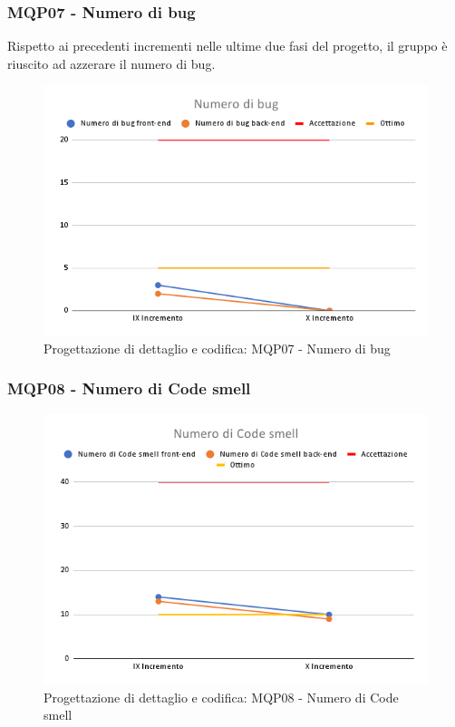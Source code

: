 \subsubsection{MQP07 - Numero di bug}
Rispetto ai precedenti incrementi nelle ultime due fasi del progetto, il gruppo è riuscito ad azzerare il numero di bug.
\begin{figure}[H]
    \centering
    \includegraphics[scale=0.50]{Sezioni/images/last_prodotto/Numero_di_bug.png}
    \caption{Progettazione di dettaglio e codifica: MQP07 - Numero di bug}
\end{figure}
\subsubsection{MQP08 - Numero di Code smell}
\begin{figure}[H]
    \centering
    \includegraphics[scale=0.50]{Sezioni/images/last_prodotto/Numero_di_Code_smell.png}
    \caption{Progettazione di dettaglio e codifica: MQP08 - Numero di Code smell}
\end{figure}
